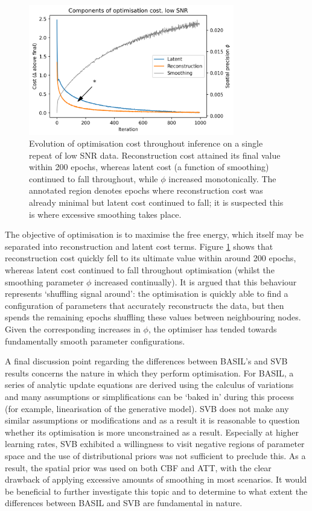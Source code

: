 \documentclass[12pt]{report}
\begin{document}
\begin{figure}[H]
\centering
\includegraphics[width=0.8\textwidth]{optimisation_cost.png}
\caption{Evolution of optimisation cost throughout inference on a single repeat of low SNR data. Reconstruction cost attained its final value within 200 epochs, whereas latent cost (a function of smoothing) continued to fall throughout, while $\phi$ increased monotonically. The annotated region denotes epochs where reconstruction cost was already minimal but latent cost continued to fall; it is suspected this is where excessive smoothing takes place.}
\label{optimisation_cost} 
\end{figure}

The objective of optimisation is to maximise the free energy, which itself may be separated into reconstruction and latent cost terms. Figure \ref{optimisation_cost} shows that reconstruction cost quickly fell to its ultimate value within around 200 epochs, whereas latent cost continued to fall throughout optimisation (whilst the smoothing parameter $\phi$ increased continually). It is argued that this behaviour represents `shuffling signal around': the optimisation is quickly able to find a configuration of parameters that accurately reconstructs the data, but then spends the remaining epochs shuffling these values between neighbouring nodes. Given the corresponding increases in $\phi$, the optimiser has tended towards fundamentally smooth parameter configurations. 

A final discussion point regarding the differences between BASIL's and SVB results concerns the nature in which they perform optimisation. For BASIL, a series of analytic update equations are derived using the calculus of variations and many assumptions or simplifications can be `baked in' during this process (for example, linearisation of the generative model). SVB does not make any similar assumptions or modifications and as a result it is reasonable to question whether its optimisation is more unconstrained as a result. Especially at higher learning rates, SVB exhibited a willingness to visit negative regions of parameter space and the use of distributional priors was not sufficient to preclude this. As a result, the spatial prior was used on both CBF and ATT, with the clear drawback of applying excessive amounts of smoothing in most scenarios. It would be beneficial to further investigate this topic and to determine to what extent the differences between BASIL and SVB are fundamental in nature. 
\end{document}
